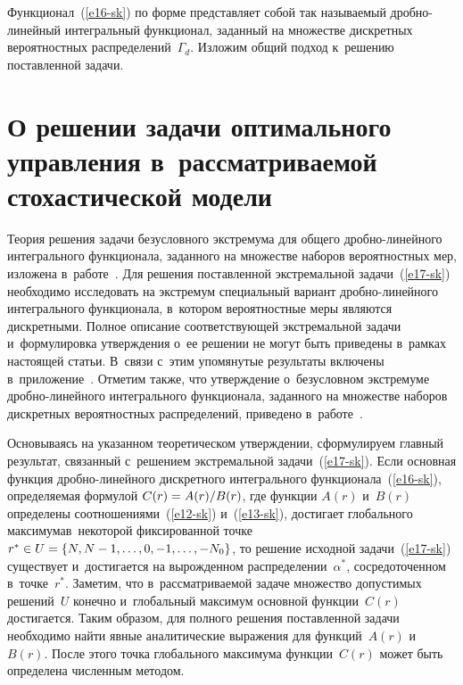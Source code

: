 \begin{multicols}{2}
  Функционал~(\ref{e16-sk}) по форме пред\-став\-ля\-ет собой так называемый 
дроб\-но-ли\-ней\-ный интегральный функционал, заданный на множестве 
дискретных вероятностных распределений~$\Gamma_d$. Изложим общий подход 
к~решению по\-став\-лен\-ной задачи.

\section{О решении задачи оптимального управления 
в~рассматриваемой стохастической модели}

  Теория решения задачи безусловного экстремума для общего 
  дроб\-но-ли\-ней\-но\-го интегрального функционала, заданного на множестве наборов 
вероятностных мер, изложена в~работе~\cite{11-sk}. Для решения поставленной 
экстремальной задачи~(\ref{e17-sk}) необходимо исследовать на экстремум 
специальный вариант дроб\-но-ли\-ней\-но\-го интегрального функционала, 
в~котором вероятностные меры являются дискретными. Полное описание 
соответствующей экстремальной задачи и~формулировка утверждения о~ее 
решении не могут быть приведены в~рамках на\-сто\-ящей статьи. В~связи с~этим 
упомянутые результаты включены в~приложение~\cite{12-sk}. Отметим также, 
что утверждение о~безуслов\-ном экстремуме дроб\-но-ли\-ней\-но\-го интегрального 
функционала, заданного на множестве наборов дискретных вероятностных 
распределений, приведено в~работе~\cite{13-sk}.
  
  Основываясь на указанном теоретическом утверждении, сформулируем 
главный результат, связанный с~решением экстремальной задачи~(\ref{e17-sk}).\linebreak 
Если основная функция дроб\-но-ли\-ней\-но\-го дискретного интегрального 
функционала~(\ref{e16-sk}), определяемая формулой $C(r)\hm= A(r)/B(r)$, где\linebreak 
функции $A(r)$ и~$B(r)$ определены соотношениями~(\ref{e12-sk}) 
и~(\ref{e13-sk}), достигает глобального максимума\linebreak в~некоторой фиксированной 
точке $r^*\hm\in U\hm= \left\{ N, N-1, \ldots , 0, -1, \ldots , -N_0\right\}$, то 
решение исходной задачи~(\ref{e17-sk}) существует и~достигается на 
вырожденном распределении~$\alpha^*$, сосредоточенном в~точке~$r^*$. 
Заметим, что в~рас\-смат\-ри\-ва\-емой задаче множество допустимых решений~$U$ 
конечно и~глобальный максимум основной функции~$C(r)$ достигается. Таким 
образом, для полного решения поставленной задачи необходимо найти явные 
аналитические выражения для функций~$A(r)$ и~$B(r)$. После этого точ\-ка 
глобального максимума функ\-ции~$C(r)$ может быть определена чис\-лен\-ным 
методом.


\end{multicols}

